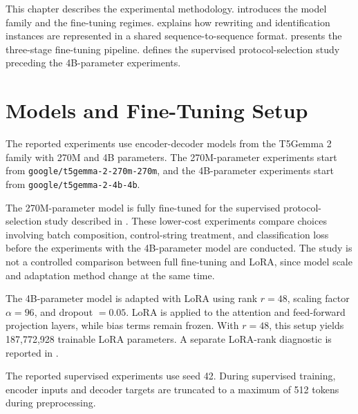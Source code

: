 \label{chap:methodology}

This chapter describes the experimental methodology. 
introduces the model family and the fine-tuning regimes.
 explains how rewriting and identification
instances are represented in a shared sequence-to-sequence format.
 presents the three-stage fine-tuning
pipeline.  defines the supervised protocol-selection
study preceding the 4B-parameter experiments.

\section{Models and Fine-Tuning Setup}
\label{sec:method-models}

The reported experiments use encoder-decoder models from the T5Gemma 2 family
\citep{zhang2025t5gemma2seeingreading} with 270M and 4B parameters. The 270M-parameter experiments start from \texttt{google/\allowbreak{}t5gemma-\allowbreak{}2-\allowbreak{}270m-\allowbreak{}270m},
and the 4B-parameter experiments start from \texttt{google/t5gemma-2-4b-4b}.

The 270M-parameter model is fully fine-tuned for the supervised
protocol-selection study described in . These
lower-cost experiments compare choices involving batch composition,
control-string treatment, and classification loss before the experiments with
the 4B-parameter model are conducted. The study is not a controlled
comparison between full fine-tuning and LoRA, since model scale and adaptation
method change at the same time.

The 4B-parameter model is adapted with LoRA using rank \(r=48\), scaling factor
\(\alpha=96\), and dropout \(=0.05\). LoRA is applied to the attention and
feed-forward projection layers, while bias terms remain frozen. With \(r=48\),
this setup yields 187,772,928 trainable LoRA parameters. A separate LoRA-rank
diagnostic is reported in .

The reported supervised experiments use seed 42. During supervised training,
encoder inputs and decoder targets are truncated to a maximum of 512 tokens
during preprocessing.


